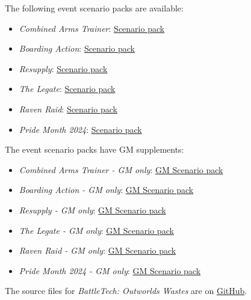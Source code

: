 The following event scenario packs are available:

\begin{itemize}

\item \emph{Combined Arms Trainer}: \href{https://raw.githubusercontent.com/Eudicods/outworlds-wastes/rules-pdf/combined-arms-trainer.pdf}{Scenario pack}

\item \emph{Boarding Action}: \href{https://raw.githubusercontent.com/Eudicods/outworlds-wastes/rules-pdf/boarding-action.pdf}{Scenario pack}

\item \emph{Resupply}: \href{https://raw.githubusercontent.com/Eudicods/outworlds-wastes/rules-pdf/resupply.pdf}{Scenario pack}

\item \emph{The Legate}: \href{https://raw.githubusercontent.com/Eudicods/outworlds-wastes/rules-pdf/the-legate.pdf}{Scenario pack}

\item \emph{Raven Raid}: \href{https://raw.githubusercontent.com/Eudicods/outworlds-wastes/rules-pdf/raven-raid.pdf}{Scenario pack}

\item \emph{Pride Month 2024}: \href{https://raw.githubusercontent.com/Eudicods/outworlds-wastes/rules-pdf/pride-2024.pdf}{Scenario pack}

\end{itemize}

The event scenario packs have GM supplements:

\begin{itemize}

\item \emph{Combined Arms Trainer - GM only}: \href{https://raw.githubusercontent.com/Eudicods/outworlds-wastes/rules-pdf/combined-arms-trainer-gm-only.pdf}{GM Scenario pack}

\item \emph{Boarding Action - GM only}: \href{https://raw.githubusercontent.com/Eudicods/outworlds-wastes/rules-pdf/boarding-action-gm-only.pdf}{GM Scenario pack}

\item \emph{Resupply - GM only}: \href{https://raw.githubusercontent.com/Eudicods/outworlds-wastes/rules-pdf/resupply-gm-only.pdf}{GM Scenario pack}

\item \emph{The Legate - GM only}: \href{https://raw.githubusercontent.com/Eudicods/outworlds-wastes/rules-pdf/the-legate-gm-only.pdf}{GM Scenario pack}

\item \emph{Raven Raid - GM only}: \href{https://raw.githubusercontent.com/Eudicods/outworlds-wastes/rules-pdf/raven-raid-gm-only.pdf}{GM Scenario pack}

\item \emph{Pride Month 2024 - GM only}: \href{https://raw.githubusercontent.com/Eudicods/outworlds-wastes/rules-pdf/pride-2024-gm-only.pdf}{GM Scenario pack}

\end{itemize}

The source files for \emph{BattleTech: Outworlds Wastes} are on \href{https://github.com/Eudicods/outworlds-wastes}{GitHub}.
